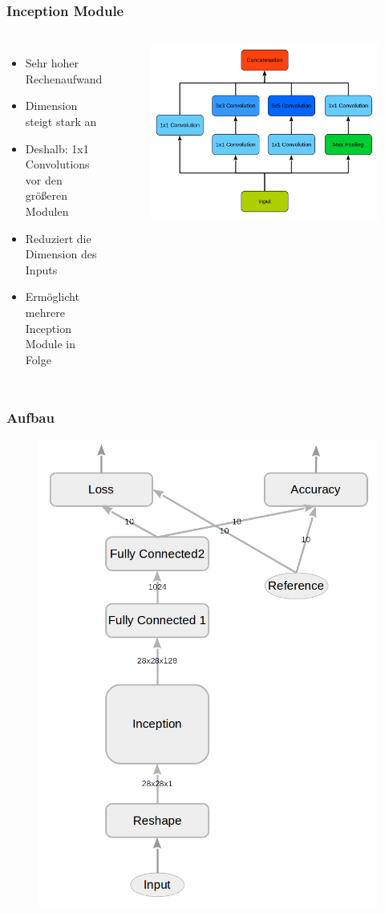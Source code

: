 \documentclass{beamer}
\begin{document}
\begin{frame}
	\frametitle{Inception Module}
	\begin{columns}[c]
		\begin{itemize}
			\item Sehr hoher Rechenaufwand
			\item Dimension steigt stark an
			\item Deshalb: 1x1 Convolutions vor den größeren Modulen
			\item Reduziert die Dimension des Inputs
			\item Erm\"{o}glicht mehrere Inception Module in Folge 
		\end{itemize}
		
		\begin{figure}
			\includegraphics[width=\linewidth]{images/inception_pro_graph.png}
		\end{figure}
	\end{columns}
\end{frame}

\begin{frame}
	\frametitle{Aufbau}
	\begin{figure}
		\includegraphics[width=0.4\linewidth]{images/main_graph_inception_reduced.png}
	\end{figure}
\end{frame}
\end{document}
